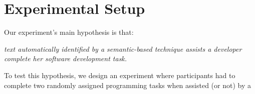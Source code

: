 \clearpage

\section{Experimental Setup}
\label{cp6:procedures}



Our experiment's main hypothesis is that:


\medskip
\begin{bluequote}
    \textit{text automatically identified by a semantic-based technique assists a 
    developer complete her software development task.} 
\end{bluequote}



To test this hypothesis, we design an experiment where  participants
 had to complete two randomly assigned programming tasks when assisted (or not) by a
